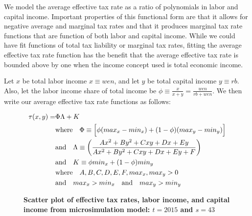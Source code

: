 \documentclass[letterpaper,12pt]{article}
\theoremstyle{definition}
\begin{document}
\begin{spacing}{1.5}
    We model the average effective tax rate as a ratio of polynomials in labor and capital income.  Important properties of this functional form are that it allows for negative average and marginal tax rates and that it produces marginal tax rate functions that are function of both labor and capital income.  While we could have fit functions of total tax liability or marginal tax rates, fitting the average effective tax rate function has the benefit that the average effective tax rate is bounded above by one when the income concept used is total economic income.

    Let $x$ be total labor income $x\equiv wen$, and let $y$ be total capital income $y\equiv rb$. Also, let the labor income share of total income be $\phi\equiv\frac{x}{x+y}=\frac{wen}{rb + wen}$.  We then write our average effective tax rate functions as follows:

    \begin{equation}\label{EqATR}
      \begin{split}
        \tau(x,y) = &\Phi\Lambda + K \\
        &\text{where}\quad \Phi \equiv \Bigl[\phi(max_x - min_x) + (1 - \phi)(max_y - min_y)\Bigr] \\
        &\text{and}\quad \Lambda \equiv \biggl(\frac{Ax^2 + By^2 + Cxy + Dx + Ey}{Ax^2 + By^2 + Cxy + Dx + Ey + F}\biggr) \\
        &\text{and}\quad K \equiv \phi min_x + (1 - \phi)min_y \\
        &\text{where}\quad A,B,C,D,E,F,max_x,max_y > 0 \\
        &\text{and}\quad max_x > min_x \quad\text{and}\quad max_y > min_y
      \end{split}
    \end{equation}

    \begin{figure}[htbp]\centering \captionsetup{width=4.0in}
      \caption{\label{FigMicroTaxData3D}\textbf{Scatter plot of effective tax rates, labor income, and capital income from microsimulation model: $t=2015$ and $s=43$}}
    \end{figure}


\end{spacing}
\end{document}

